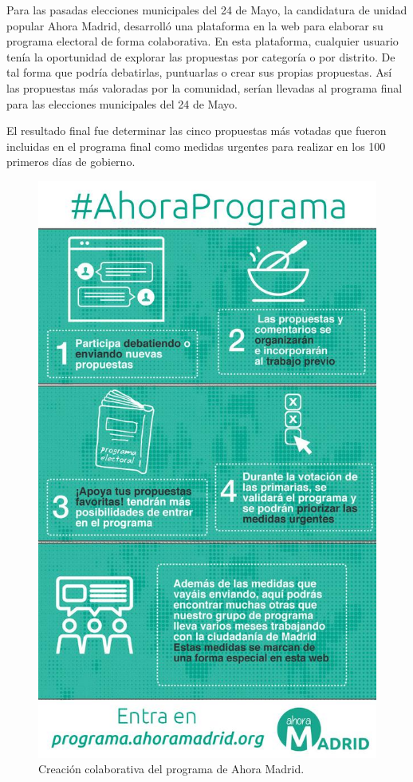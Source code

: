 Para las pasadas elecciones municipales del 24 de Mayo, la candidatura de unidad popular Ahora Madrid, desarrolló una plataforma en la web para elaborar su programa electoral de forma colaborativa. En esta plataforma, cualquier usuario tenía la oportunidad de explorar las propuestas por categoría o por distrito. De tal forma que podría debatirlas, puntuarlas o crear sus propias propuestas. Así las propuestas más valoradas por la comunidad, serían llevadas al programa final para las elecciones municipales del 24 de Mayo.

El resultado final fue determinar las cinco propuestas más votadas que fueron incluidas en el programa final como medidas urgentes para realizar en los 100 primeros días de gobierno. 

\begin{figure}[H]
\centering
\includegraphics[keepaspectratio, scale=0.25]{Media/Captures/programaAhoraMadrid.jpg}
\caption{Creación colaborativa del programa de Ahora Madrid.}
\label{fig:programaAhoraMadrid}
\end{figure}

